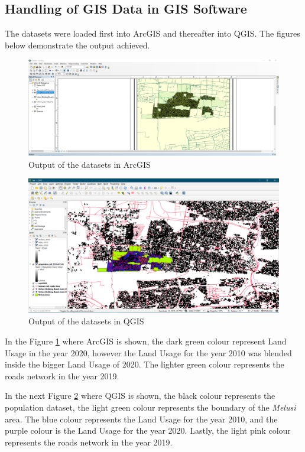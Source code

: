 \subsection{Handling of GIS Data in GIS Software}
The datasets were loaded first into ArcGIS and thereafter into QGIS. The figures below demonstrate the output achieved.
\begin{figure}[H]
\centering
\includegraphics[scale=0.3]{Figures/Chapter3/ArcGIS}
\caption{Output of the datasets in ArcGIS}
\label{fig:Arc}
\end{figure}
\begin{figure}[H]
\centering
\includegraphics[scale=0.35]{Figures/Chapter3/QGIS}
\caption{Output of the datasets in QGIS}
\label{fig:Q}
\end{figure}
In the Figure \ref{fig:Arc} where ArcGIS is shown, the dark green colour represent Land Usage in the year 2020, however the Land Usage for the year 2010 was blended inside the bigger Land Usage of 2020. The lighter green colour represents the roads network in the year 2019.

In the next Figure \ref{fig:Q} where QGIS is shown, the black colour represents the population dataset, the light green colour represents the boundary of the \textit{Melusi} area. The blue colour represents the Land Usage for the year 2010, and the purple colour is the Land Usage for the year 2020. Lastly, the light pink colour represents the roads network in the year 2019.

